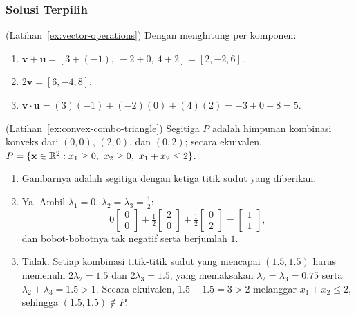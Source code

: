 \subsubsection*{Solusi Terpilih}

\begin{solution}(Latihan~\ref{ex:vector-operations})
Dengan menghitung per komponen:
\begin{enumerate}
    \item \( \mathbf{v} + \mathbf{u} = [3 + (-1),\ -2 + 0,\ 4 + 2] = [2, -2, 6] \).
    \item \( 2\mathbf{v} = [6, -4, 8] \).
    \item \( \mathbf{v} \cdot \mathbf{u} = (3)(-1) + (-2)(0) + (4)(2) = -3 + 0 + 8 = 5 \).
\end{enumerate}
\end{solution}


\begin{solution}(Latihan~\ref{ex:convex-combo-triangle})
Segitiga \( P \) adalah himpunan kombinasi konveks dari \( (0,0) \), \( (2,0) \), dan \( (0,2) \); secara ekuivalen, \( P = \{ \mathbf{x} \in \mathbb{R}^2 : x_1 \geq 0,\ x_2 \geq 0,\ x_1 + x_2 \leq 2 \} \).

\begin{enumerate}
    \item Gambarnya adalah segitiga dengan ketiga titik sudut yang diberikan.
    \item Ya. Ambil \( \lambda_1 = 0 \), \( \lambda_2 = \lambda_3 = \tfrac12 \):
    \[
    0 \begin{bmatrix} 0 \\ 0 \end{bmatrix} + \tfrac12 \begin{bmatrix} 2 \\ 0 \end{bmatrix} + \tfrac12 \begin{bmatrix} 0 \\ 2 \end{bmatrix} = \begin{bmatrix} 1 \\ 1 \end{bmatrix},
    \]
    dan bobot-bobotnya tak negatif serta berjumlah \( 1 \).
    \item Tidak. Setiap kombinasi titik-titik sudut yang mencapai \( (1.5, 1.5) \) harus memenuhi \( 2\lambda_2 = 1.5 \) dan \( 2\lambda_3 = 1.5 \), yang memaksakan \( \lambda_2 = \lambda_3 = 0.75 \) serta \( \lambda_2 + \lambda_3 = 1.5 > 1 \). Secara ekuivalen, \( 1.5 + 1.5 = 3 > 2 \) melanggar \( x_1 + x_2 \leq 2 \), sehingga \( (1.5, 1.5) \notin P \).
\end{enumerate}
\end{solution}

